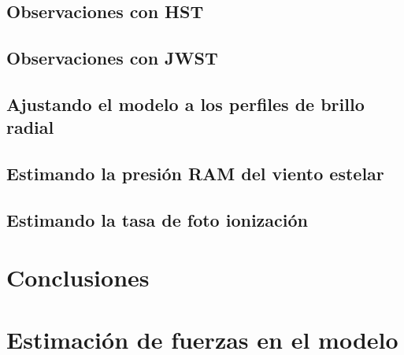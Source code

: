 \documentclass{book}
\begin{document}
\section{Observaciones con HST}

\section{Observaciones con JWST}

\section{Ajustando el modelo a los perfiles de brillo radial}

\section{Estimando la presión RAM del viento estelar}

\section{Estimando la tasa de foto ionización}

\chapter{Conclusiones}

\appendix
\chapter{Estimación de fuerzas en el modelo}
\end{document}
